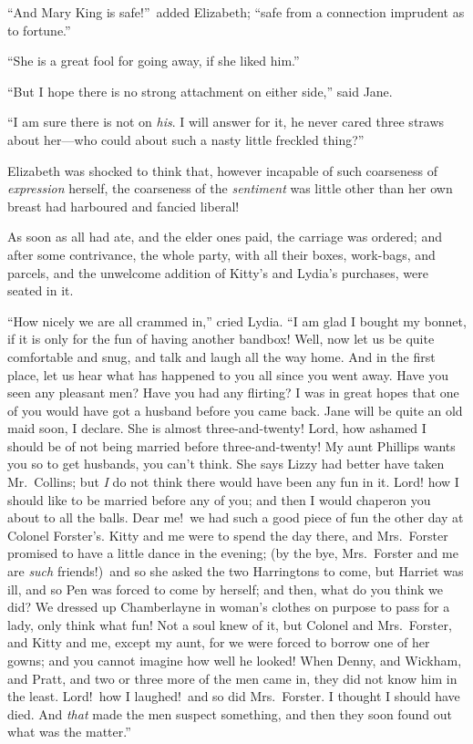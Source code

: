 \documentclass[12pt,english]{book}
\begin{document}
{}``And Mary King is safe!''\ added Elizabeth; {}``safe from a
connection imprudent as to fortune.''

{}``She is a great fool for going away, if she liked him.''

{}``But I hope there is no strong attachment on either side,'' said
Jane.

{}``I am sure there is not on \textit{his}. I will answer for it,
he never cared three straws about her\mbox{---}who could about such
a nasty little freckled thing?''\ 

Elizabeth was shocked to think that, however incapable of such coarseness
of \textit{expression} herself, the coarseness of the \textit{sentiment}
was little other than her own breast had harboured and fancied liberal!

As soon as all had ate, and the elder ones paid, the carriage was
ordered; and after some contrivance, the whole party, with all their
boxes, work-bags, and parcels, and the unwelcome addition of Kitty's
and Lydia's purchases, were seated in it.

{}``How nicely we are all crammed in,'' cried Lydia. {}``I am glad
I bought my bonnet, if it is only for the fun of having another bandbox!
Well, now let us be quite comfortable and snug, and talk and laugh
all the way home. And in the first place, let us hear what has happened
to you all since you went away. Have you seen any pleasant men? Have
you had any flirting? I was in great hopes that one of you would have
got a husband before you came back. Jane will be quite an old maid
soon, I declare. She is almost three-and-twenty! Lord, how ashamed
I should be of not being married before three-and-twenty! My aunt
Phillips wants you so to get husbands, you can't think. She says Lizzy
had better have taken Mr.\ Collins; but \textit{I} do not think there
would have been any fun in it. Lord! how I should like to be married
before any of you; and then I would chaperon you about to all the
balls. Dear me!\ we had such a good piece of fun the other day at
Colonel Forster's. Kitty and me were to spend the day there, and Mrs.\ Forster
promised to have a little dance in the evening; (by the bye, Mrs.\ Forster
and me are \textit{such} friends!)\ and so she asked the two Harringtons
to come, but Harriet was ill, and so Pen was forced to come by herself;
and then, what do you think we did? We dressed up Chamberlayne in
woman's clothes on purpose to pass for a lady, only think what fun!
Not a soul knew of it, but Colonel and Mrs.\ Forster, and Kitty and
me, except my aunt, for we were forced to borrow one of her gowns;
and you cannot imagine how well he looked! When Denny, and Wickham,
and Pratt, and two or three more of the men came in, they did not
know him in the least. Lord!\ how I laughed!\ and so did Mrs.\ Forster.
I thought I should have died. And \textit{that} made the men suspect
something, and then they soon found out what was the matter.''
\end{document}
